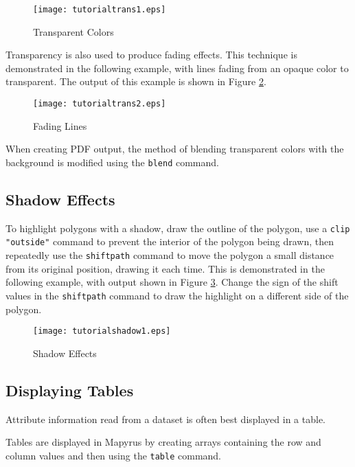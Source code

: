 \begin{figure}[htb]
\texttt{[image: tutorialtrans1.eps]}
\caption{Transparent Colors}
\label{tutorialtrans1}
\end{figure}

Transparency is also used to produce fading effects.
This technique is demonstrated in the following example, with
lines fading from an opaque color to transparent.
The output of this example is shown in Figure \ref{tutorialtrans2}.



\begin{figure}[htb]
\texttt{[image: tutorialtrans2.eps]}
\caption{Fading Lines}
\label{tutorialtrans2}
\end{figure}

When creating PDF output, the method of blending transparent colors
with the background is modified using the
\texttt{blend} command.

\subsection{Shadow Effects}
\label{tutorialshadow}

To highlight polygons with a shadow, draw the outline of the polygon, use a
\texttt{clip "outside"}
command to prevent the interior of the polygon being drawn,
then repeatedly use the \texttt{shiftpath} command to move the polygon a small
distance from its original position, drawing it each time.  This is
demonstrated in the following example, with output shown in Figure
\ref{tutorialshadow1}.  Change the sign of the shift values in the
\texttt{shiftpath} command to draw the highlight on a different side of the
polygon.



\begin{figure}[htb]
\texttt{[image: tutorialshadow1.eps]}
\caption{Shadow Effects}
\label{tutorialshadow1}
\end{figure}

\subsection{Displaying Tables}

Attribute information read from a dataset is often best
displayed in a table.

Tables are displayed in Mapyrus by creating arrays containing
the row and column values and then using the \texttt{table} command.

